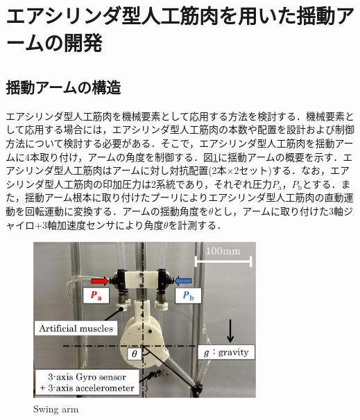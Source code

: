 \section{エアシリンダ型人工筋肉を用いた揺動アームの開発}%
\subsection{揺動アームの構造}
エアシリンダ型人工筋肉を機械要素として応用する方法を検討する．機械要素として応用する場合には，エアシリンダ型人工筋肉の本数や配置を設計および制御方法について検討する必要がある．そこで，エアシリンダ型人工筋肉を揺動アームに4本取り付け，アームの角度を制御する．図\ref{Swing arm}に揺動アームの概要を示す．エアシリンダ型人工筋肉はアームに対し対抗配置(2本×2セット)する．なお，エアシリンダ型人工筋肉の印加圧力は2系統であり，それぞれ圧力$P_\mathrm{a}$，$P_\mathrm{b}$とする．また，揺動アーム根本に取り付けたプーリによりエアシリンダ型人工筋肉の直動運動を回転運動に変換する．アームの揺動角度を$\theta$とし，アームに取り付けた3軸ジャイロ+3軸加速度センサにより角度$\theta$を計測する．
\begin{figure}[t]
  \centering
  \includegraphics[width=85mm]{_pdf/swing_arm.pdf}
  \caption{Swing arm}
  \label{Swing arm}
\end{figure}

